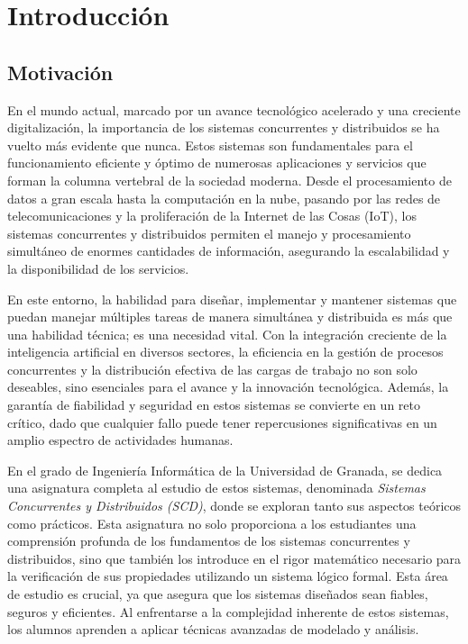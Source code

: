 \chapter{\textbf{Introducción}}

\section{Motivación}
En el mundo actual, marcado por un avance tecnológico acelerado y una creciente digitalización, la importancia de los sistemas concurrentes y distribuidos se ha vuelto más evidente que nunca. Estos sistemas son fundamentales para el funcionamiento eficiente y óptimo de numerosas aplicaciones y servicios que forman la columna vertebral de la sociedad moderna. Desde el procesamiento de datos a gran escala hasta la computación en la nube, pasando por las redes de telecomunicaciones y la proliferación de la Internet de las Cosas (IoT), los sistemas concurrentes y distribuidos permiten el manejo y procesamiento simultáneo de enormes cantidades de información, asegurando la escalabilidad y la disponibilidad de los servicios.

En este entorno, la habilidad para diseñar, implementar y mantener sistemas que puedan manejar múltiples tareas de manera simultánea y distribuida es más que una habilidad técnica; es una necesidad vital. Con la integración creciente de la inteligencia artificial en diversos sectores, la eficiencia en la gestión de procesos concurrentes y la distribución efectiva de las cargas de trabajo no son solo deseables, sino esenciales para el avance y la innovación tecnológica. Además, la garantía de fiabilidad y seguridad en estos sistemas se convierte en un reto crítico, dado que cualquier fallo puede tener repercusiones significativas en un amplio espectro de actividades humanas.

En el grado de Ingeniería Informática de la Universidad de Granada, se dedica una asignatura completa al estudio de estos sistemas, denominada \textit{Sistemas Concurrentes y Distribuidos (SCD)}, donde se exploran tanto sus aspectos teóricos como prácticos. Esta asignatura no solo proporciona a los estudiantes una comprensión profunda de los fundamentos de los sistemas concurrentes y distribuidos, sino que también los introduce en el rigor matemático necesario para la verificación de sus propiedades utilizando un sistema lógico formal. Esta área de estudio es crucial, ya que asegura que los sistemas diseñados sean fiables, seguros y eficientes. Al enfrentarse a la complejidad inherente de estos sistemas, los alumnos aprenden a aplicar técnicas avanzadas de modelado y análisis.

